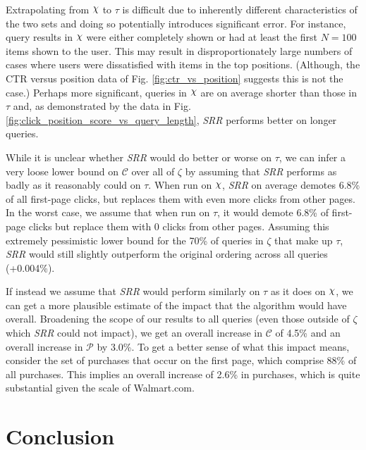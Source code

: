 \documentclass{article}
\def\Chi{\raisebox{2pt}{$\chi$}}
\begin{document}
Extrapolating from $\Chi$ to $\tau$ is difficult due to inherently different
characteristics of the two sets and doing so potentially introduces significant
error. For instance, query results in $\Chi$ were either completely shown or
had at least the first $N=100$ items shown to the user. This may result in
disproportionately large numbers of cases where users were dissatisfied with
items in the top positions. (Although, the CTR versus position data of Fig.
\ref{fig:ctr_vs_position} suggests this is not the case.) Perhaps more
significant, queries in $\Chi$ are on average shorter than those in $\tau$ and,
as demonstrated by the data in Fig.
\ref{fig:click_position_score_vs_query_length}, {\em SRR} performs better on
longer queries. 

While it is unclear whether {\em SRR} would do better or worse on $\tau$, we
can infer a very loose lower bound on $\mathscr{C}$ over all of $\zeta$ by
assuming that {\em SRR} performs as badly as it reasonably could on $\tau$.
When run on $\Chi$, {\em SRR} on average demotes 6.8\% of all first-page clicks,
but replaces them with even more clicks from other pages. In the worst case, we
assume that when run on $\tau$, it would demote 6.8\% of first-page clicks but
replace them with 0 clicks from other pages. Assuming this extremely
pessimistic lower bound for the 70\% of queries in $\zeta$ that make up $\tau$,
{\em SRR} would still slightly outperform the original ordering across all
queries (+0.004\%).

If instead we assume that {\em SRR} would perform similarly on $\tau$ as it
does on $\Chi$, we can get a more plausible estimate of the impact that the
algorithm would have overall. Broadening the scope of our results to all
queries (even those outside of $\zeta$ which {\em SRR} could not impact), we
get an overall increase in $\mathscr{C}$ of 4.5\% and an overall increase in
$\mathscr{P}$ by 3.0\%. To get a better sense of what this impact means,
consider the set of purchases that occur on the first page, which comprise 88\%
of all purchases. This implies an overall increase of 2.6\% in purchases, which
is quite substantial given the scale of Walmart.com.

\section{Conclusion}
\end{document}
